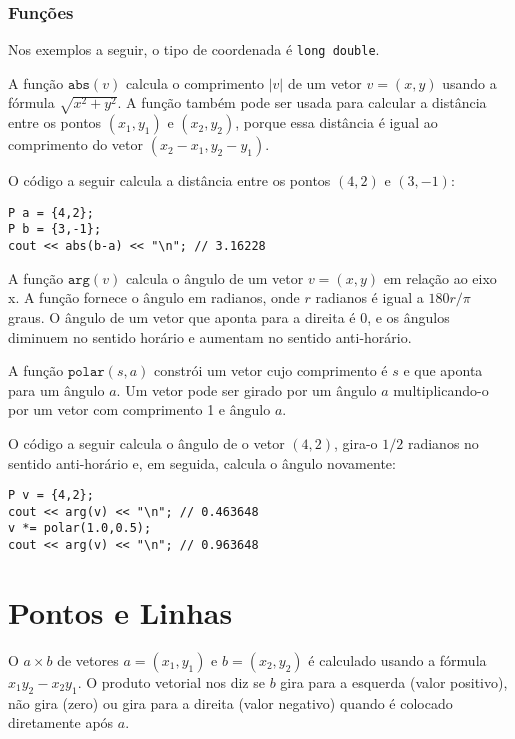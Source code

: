 \subsubsection*{Funções}

Nos exemplos a seguir, o tipo de coordenada é
\texttt{long double}.

A função $\texttt{abs}(v)$ calcula o comprimento
$|v|$ de um vetor $v=(x,y)$
usando a fórmula $\sqrt{x^2+y^2}$.
A função também pode ser usada para
calcular a distância entre os pontos
$(x_1,y_1)$ e $(x_2,y_2)$,
porque essa distância é igual ao comprimento
do vetor $(x_2-x_1,y_2-y_1)$.

O código a seguir calcula a distância
entre os pontos $(4,2)$ e $(3,-1)$:
\begin{lstlisting}
P a = {4,2};
P b = {3,-1};
cout << abs(b-a) << "\n"; // 3.16228
\end{lstlisting}

A função $\texttt{arg}(v)$ calcula o
ângulo de um vetor $v=(x,y)$ em relação ao eixo x.
A função fornece o ângulo em radianos,
onde $r$ radianos é igual a $180 r/\pi$ graus.
O ângulo de um vetor que aponta para a direita é 0,
e os ângulos diminuem no sentido horário e aumentam
no sentido anti-horário.

A função $\texttt{polar}(s,a)$ constrói um vetor
cujo comprimento é $s$ e que aponta para um ângulo $a$.
Um vetor pode ser girado por um ângulo $a$
multiplicando-o por um vetor com comprimento 1 e ângulo $a$.

O código a seguir calcula o ângulo de
o vetor $(4,2)$, gira-o $1/2$ radianos
no sentido anti-horário e, em seguida, calcula o ângulo novamente:

\begin{lstlisting}
P v = {4,2};
cout << arg(v) << "\n"; // 0.463648
v *= polar(1.0,0.5);
cout << arg(v) << "\n"; // 0.963648
\end{lstlisting}

\section{Pontos e Linhas}


O  $a \times b$ de vetores
$a=(x_1,y_1)$ e $b=(x_2,y_2)$ é calculado
usando a fórmula $x_1 y_2 - x_2 y_1$.
O produto vetorial nos diz se $b$
gira para a esquerda (valor positivo), não gira (zero)
ou gira para a direita (valor negativo)
quando é colocado diretamente após $a$.


